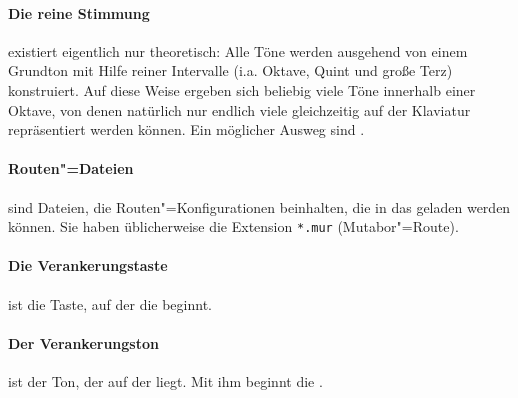 \paragraph{Die reine Stimmung}\label{sec:MT_JUST} existiert eigentlich nur
  theoretisch: Alle Töne werden ausgehend von einem Grundton mit Hilfe
  reiner Intervalle (i.a.  Oktave, Quint und große Terz) konstruiert.
  Auf diese Weise ergeben sich beliebig viele Töne innerhalb einer
  Oktave, von denen natürlich nur endlich viele gleichzeitig auf der
  Klaviatur repräsentiert werden können. Ein möglicher Ausweg sind
  .

\paragraph{Routen"=Dateien}\label{sec:DV_ROUTESFILE} sind
  Dateien, die Routen"=Konfigurationen beinhalten, die in das
   geladen werden können.  Sie
  haben üblicherweise die Extension \texttt{*.mur} (Mutabor"=Route).

\paragraph{Die Verankerungstaste}\label{sec:DV_BASEKEY} ist die
  Taste, auf der die 
  beginnt.

\paragraph{Der Verankerungston}\label{sec:DV_BASETONE} ist der
  Ton, der auf der  liegt.
  Mit ihm beginnt die .




